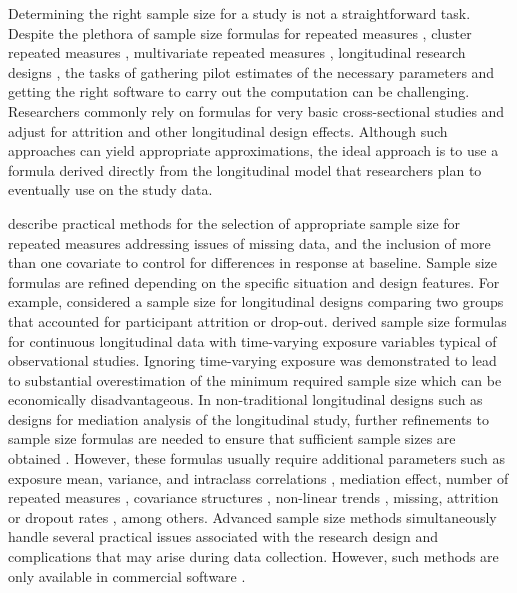 Determining the right sample size for a study is not a straightforward task. Despite the plethora of sample size formulas for repeated measures \citep{Overall_Doyle(1994),Lui(1992),Rochon(1991), Guo_etal(2013)}, cluster repeated measures \citep{Liu_Shih_Gehan(2002)}, multivariate repeated measures \citep{Vonesh_Schork(1986),Guo_Johnson(1996)}, longitudinal research designs \citep{Lefante(1990)}, the tasks of gathering pilot estimates of the necessary parameters and getting the right software to carry out the computation can be challenging. Researchers commonly rely on formulas for very basic cross-sectional studies and adjust for attrition and other longitudinal design effects. Although such approaches can yield appropriate approximations, the ideal approach is to use a formula derived directly from the longitudinal model that researchers plan to eventually use on the study data.

\cite{Guo_etal(2013)} describe practical methods for the selection of appropriate sample size for repeated measures addressing issues of missing data, and the inclusion of more than one covariate to control for differences in response at baseline. Sample size formulas are refined depending on the specific situation and design features. For example, \cite{Hedeker_Gibbons_Waternaux(1999)} considered a sample size for longitudinal designs comparing two groups that accounted for participant attrition or drop-out. \cite{Basagana_Liao_Spiegelman(2011)} derived sample size formulas for continuous longitudinal data with time-varying exposure variables typical of observational studies. Ignoring time-varying exposure was demonstrated to lead to substantial overestimation of the minimum required sample size which can be economically disadvantageous. In non-traditional longitudinal designs such as designs for mediation analysis of the longitudinal study, further refinements to sample size formulas are needed to ensure that sufficient sample sizes are obtained \citep{Pan_etal(2018)}. However, these formulas usually require additional parameters such as exposure mean, variance, and intraclass correlations \citep{Basagana_Liao_Spiegelman(2011)}, mediation effect, number of repeated measures  \citep{Pan_etal(2018)}, covariance structures \citep{Rochon(1991)}, non-linear trends \citep{Yan_Su(2006)}, missing, attrition or dropout rates \citep{Roy_etal(2007), Lu_Luo_Chen(2008)}, among others.  Advanced sample size methods simultaneously handle several practical issues associated with the research design and complications that may arise during data collection. However, such methods are only available in commercial software \citep{NCSS(2021),nQuery(2021)}. 

